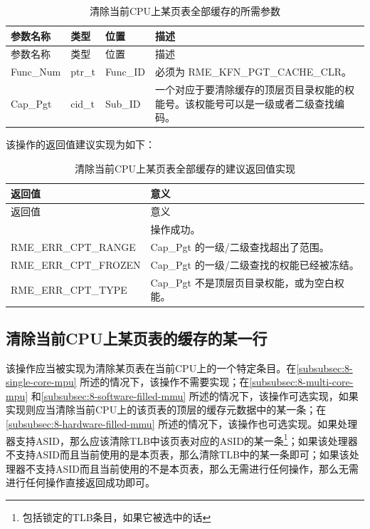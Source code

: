 \begin{xltabular}{\textwidth}{@{}>{\hsize\raggedright\arraybackslash}X>{\hsize\raggedright\arraybackslash}X>{\hsize\raggedright\arraybackslash}X>{\hsize\raggedright\arraybackslash}X@{}}
\caption{清除当前CPU上某页表全部缓存的所需参数}\label{tab:8-5-clear-all-page-table-cache-parameters}\\
\toprule
参数名称 & 类型 & 位置 & 描述\tabularnewline
\endfirsthead
\toprule
参数名称 & 类型 & 位置 & 描述\tabularnewline
\midrule
\endhead
\bottomrule
\endlastfoot
Func\_Num & ptr\_t & Func\_ID & 必须为 RME\_KFN\_PGT\_CACHE\_CLR。\tabularnewline
Cap\_Pgt & cid\_t & Sub\_ID &
一个对应于要清除缓存的顶层页目录权能的权能号。该权能号可以是一级或者二级查找编码。\tabularnewline
\end{xltabular}

该操作的返回值建议实现为如下：

\begin{xltabular}{\textwidth}{@{}>{\hsize\raggedright\arraybackslash}X>{\hsize\raggedright\arraybackslash}X@{}}
\caption{清除当前CPU上某页表全部缓存的建议返回值实现}\label{tab:8-6-clear-all-page-table-cache-suggested-return-values}\\
\toprule
返回值 & 意义\tabularnewline
\endfirsthead
\toprule
返回值 & 意义\tabularnewline
\midrule
\endhead
\bottomrule
{} & 操作成功。\tabularnewline
    RME\_ERR\_CPT\_RANGE & Cap\_Pgt 的一级/二级查找超出了范围。\tabularnewline
    RME\_ERR\_CPT\_FROZEN & Cap\_Pgt 的一级/二级查找的权能已经被冻结。\tabularnewline
    RME\_ERR\_CPT\_TYPE & Cap\_Pgt 不是顶层页目录权能，或为空白权能。\tabularnewline
\end{xltabular}

\subsection{清除当前CPU上某页表的缓存的某一行}\label{subsec:8-clear-page-table-cache-line}

该操作应当被实现为清除某页表在当前CPU上的一个特定条目。在\ref{subsubsec:8-single-core-mpu}
所述的情况下，该操作不需要实现；在\ref{subsubsec:8-multi-core-mpu}
和\ref{subsubsec:8-software-filled-mmu}
所述的情况下，该操作可选实现，如果实现则应当清除当前CPU上的该页表的顶层的缓存元数据中的某一条；在\ref{subsubsec:8-hardware-filled-mmu}
所述的情况下，该操作也可选实现。如果处理器支持ASID，那么应该清除TLB中该页表对应的ASID的某一条\footnote{包括锁定的TLB条目，如果它被选中的话}；如果该处理器不支持ASID而且当前使用的是本页表，那么清除TLB中的某一条即可；如果该处理器不支持ASID而且当前使用的不是本页表，那么无需进行任何操作，那么无需进行任何操作直接返回成功即可。

